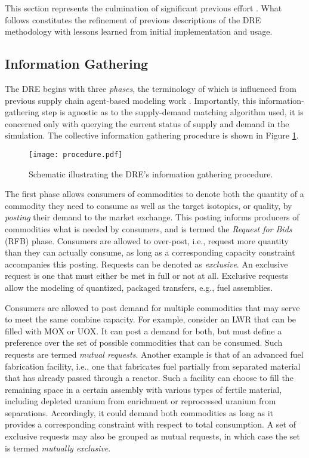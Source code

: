 This section represents the culmination of significant previous effort
\cite{gidden_agent-based_2013, gidden_agent-based_2014,
  gidden_agent-based_slc_2013}. What follows constitutes the refinement of
previous descriptions of the DRE methodology with lessons learned from initial
implementation and usage.

\subsection{Information Gathering}\label{abm:dre:info}

The DRE begins with three \textit{phases}, the terminology of which is
influenced from previous supply chain agent-based modeling work
\cite{julka_agent-based_2002}. Importantly, this information-gathering step is
agnostic as to the supply-demand matching algorithm used, it is concerned only
with querying the current status of supply and demand in the simulation. The
collective information gathering procedure is shown in Figure
\ref{fig:procedure}.

\begin{figure}
  \begin{center}
    \texttt{[image: procedure.pdf]}
    \caption[]{\label{fig:procedure}
        Schematic illustrating the DRE's information gathering procedure.}
  \end{center}
\end{figure}

The first phase allows consumers of commodities to denote both the quantity of a
commodity they need to consume as well as the target isotopics, or quality, by
\textit{posting} their demand to the market exchange. This posting informs
producers of commodities what is needed by consumers, and is termed the
\textit{Request for Bids} (RFB) phase. Consumers are allowed to over-post, i.e.,
request more quantity than they can actually consume, as long as a corresponding
capacity constraint accompanies this posting. Requests can be denoted as
\textit{exclusive}. An exclusive request is one that must either be met in full
or not at all. Exclusive requests allow the modeling of quantized, packaged
transfers, e.g., fuel assemblies. 

Consumers are allowed to post demand for multiple commodities that may serve to
meet the same combine capacity. For example, consider an LWR that can be filled
with MOX or UOX. It can post a demand for both, but must define a preference
over the set of possible commodities that can be consumed. Such requests are
termed \textit{mutual requests}. Another example is that of an advanced fuel
fabrication facility, i.e., one that fabricates fuel partially from separated
material that has already passed through a reactor. Such a facility can choose
to fill the remaining space in a certain assembly with various types of fertile
material, including depleted uranium from enrichment or reprocessed uranium from
separations. Accordingly, it could demand both commodities as long as it
provides a corresponding constraint with respect to total consumption. A set of
exclusive requests may also be grouped as mutual requests, in which case the set
is termed \textit{mutually exclusive}.

